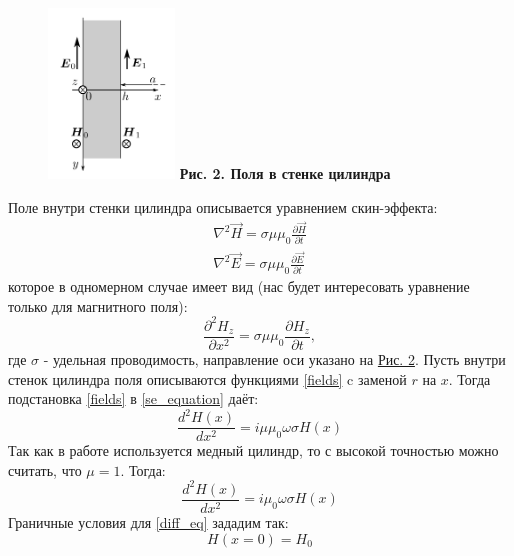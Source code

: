 \documentclass[15pt,a5paper,reqno]{article}
\begin{document}
    \hypertarget{pic_2}{\begin{figure}
        \includegraphics[width=0.3\textwidth]{images/picture_2.png}
        \textbf{Рис. 2. Поля в стенке цилиндра}
    \end{figure}}
    Поле внутри стенки цилиндра описывается уравнением скин-эффекта:
    \begin{equation*}
    \begin{split}
        \nabla^2 \vec H = \sigma\mu\mu_0 \frac{\partial \vec H}{\partial t} \\
        \nabla^2 \vec E = \sigma\mu\mu_0 \frac{\partial \vec E}{\partial t}
    \end{split}
    \end{equation*}
    которое в одномерном случае имеет вид (нас будет интересовать уравнение только для магнитного поля):
    \begin{equation}\label{se_equation}
        \frac{\partial^2 H_z}{\partial x^2} = \sigma \mu\mu_0\frac{\partial H_z}{\partial t},
    \end{equation}
    где $\sigma$ - удельная проводимость, направление оси указано на \hyperlink{pic_2}{Рис. 2}. Пусть внутри стенок цилиндра поля описываются функциями \eqref{fields} c заменой $r$ на $x$. Тогда подстановка \eqref{fields} в \eqref{se_equation} даёт:
    \begin{equation*}
        \frac{d^2H(x)}{dx^2} = i\mu\mu_0\omega\sigma H(x)
    \end{equation*}
    Так как в работе используется медный цилиндр, то с высокой точностью можно считать, что $\mu = 1$. Тогда:
    \begin{equation}\label{diff_eq}
        \frac{d^2H(x)}{dx^2} = i\mu_0\omega\sigma H(x)
    \end{equation}
    Граничные условия для \eqref{diff_eq} зададим так:
    \begin{equation}\label{condition_1}
        H(x = 0) = H_0
    \end{equation}
\end{document}
